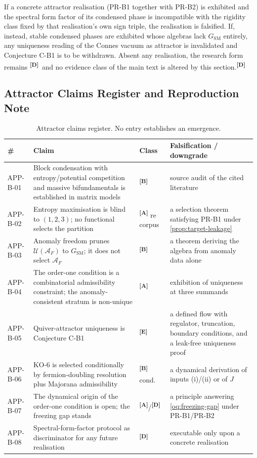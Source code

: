 \documentclass[12pt,a4paper,twoside]{article}
\theoremstyle{plain}
\theoremstyle{definition}
\theoremstyle{remark}
\newcommand{\catmark}[1]{\textsuperscript{\textsf{\textbf{[#1]}}}}
\begin{document}
\begin{killswitch}
If a concrete attractor realisation (PR-B1 together with PR-B2) is
exhibited and the spectral form factor of its condensed phase is
incompatible with the rigidity class fixed by that realisation's own sign
triple, the realisation is falsified. If, instead, stable condensed
phases are exhibited whose algebras lack $G_{\mathrm{SM}}$ entirely, any
uniqueness reading of the Connes vacuum as attractor is invalidated and
Conjecture C-B1 is to be withdrawn. Absent any realisation, the research
form remains \catmark{D}\ and no evidence class of the main text is
altered by this section.\catmark{D}
\end{killswitch}

\subsection{Attractor Claims Register and Reproduction Note}
\label{subsec:attractor-claims}

\begin{table}[htbp]
\centering\footnotesize
\begin{tabular}{@{}lp{5.3cm}lp{4.3cm}@{}}
\toprule
\# & Claim & Class & Falsification / downgrade \\
\midrule
APP-B-01 & Block condensation with entropy/potential competition and massive bifundamentals is established in matrix models & \catmark{B} & source audit of the cited literature \\
APP-B-02 & Entropy maximisation is blind to $(1,2,3)$; no functional selects the partition & \catmark{A} re corpus & a selection theorem satisfying PR-B1 under \cref{prop:target-leakage} \\
APP-B-03 & Anomaly freedom prunes $\mathcal U(\mathcal A_F)$ to $G_{\mathrm{SM}}$; it does not select $\mathcal A_F$ & \catmark{B} & a theorem deriving the algebra from anomaly data alone \\
APP-B-04 & The order-one condition is a combinatorial admissibility constraint; the anomaly-consistent stratum is non-unique & \catmark{A} & exhibition of uniqueness at three summands \\
APP-B-05 & Quiver-attractor uniqueness is Conjecture C-B1 & \catmark{E} & a defined flow with regulator, truncation, boundary conditions, and a leak-free uniqueness proof \\
APP-B-06 & KO-6 is selected conditionally by fermion-doubling resolution plus Majorana admissibility & \catmark{B} cond. & a dynamical derivation of inputs (i)/(ii) or of $J$ \\
APP-B-07 & The dynamical origin of the order-one condition is open; the freezing gap stands & \catmark{A}/\catmark{D} & a principle answering \cref{oq:freezing-gap} under PR-B1/PR-B2 \\
APP-B-08 & Spectral-form-factor protocol as discriminator for any future realisation & \catmark{D} & executable only upon a concrete realisation \\
\bottomrule
\end{tabular}
\caption{Attractor claims register. No entry establishes an emergence.}
\label{tab:attractor-claims}
\end{table}
\end{document}
